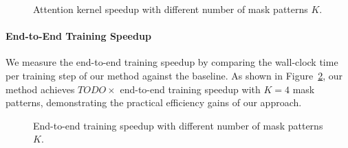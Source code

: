 \begin{figure}[t]
\centering
\caption{Attention kernel speedup with different number of mask patterns $K$.}
\label{fig:attention_speedup}
\end{figure}

\paragraph{End-to-End Training Speedup}
We measure the end-to-end training speedup by comparing the wall-clock time per training step of our method against the baseline.
As shown in Figure~\ref{fig:e2e_speedup}, our method achieves $TODO\times$ end-to-end training speedup with $K=4$ mask patterns, demonstrating the practical efficiency gains of our approach.

\begin{figure}[t]
\centering
\caption{End-to-end training speedup with different number of mask patterns $K$.}
\label{fig:e2e_speedup}
\end{figure}
